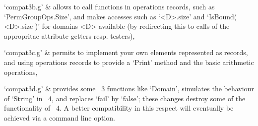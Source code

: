 `compat3b.g' &
    allows to call functions in operations records, such as
    `PermGroupOps.Size',
    and makes accesses such as `<D>.size' and `IsBound( <D>.size )'
    for domains <D> available (by redirecting this to calls of the
    appropritae attribute getters resp. testers),

`compat3c.g' &
    permits to implement your own elements represented as records,
    and using operations records to provide a `Print' method and
    the basic arithmetic operations,

`compat3d.g' &
    provides some {\GAP}~3 functions like `Domain', simulates the
    behaviour of `String' in {\GAP}~4, and replaces `fail' by `false';
    these changes destroy some of the functionality of {\GAP}~4.
    A better compatibility in this respect will eventually be achieved
    via a command line option.
\enditems


